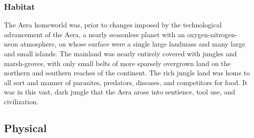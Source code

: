 \subsubsection{Habitat}
The Aera homeworld was, prior to changes imposed by the technological
advancement of the Aera, a nearly seasonless planet with an
oxygen-nitrogen-neon atmosphere, on whose surface were a single large
landmass and many large and small islands. The mainland was nearly
entirely covered with jungles and marsh-groves, with only small belts
of more sparsely overgrown land on the northern and southern reaches
of the continent. The rich jungle land was home to all sort and manner
of parasites, predators, diseases, and competitors for food. It was in
this vast, dark jungle that the Aera arose into sentience, tool use,
and civilization.

\subsection{Physical}

